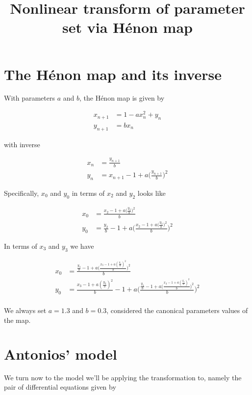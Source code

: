 \documentclass[11pt]{article}
\title{Nonlinear transform of parameter set via H\'{e}non map}
\begin{document}
\maketitle

\section{The H\'{e}non map and its inverse}

With parameters $a$ and $b$, the H\'{e}non map is given by

\begin{align*}
  x_{n+1} &= 1 - ax_n^2 + y_n \\
  y_{n+1} &= bx_n
\end{align*}

with inverse

\begin{align*}
  x_n &= \frac{y_{n+1}}{b} \\
  y_n &= x_{n+1} - 1 + a \bigg( \frac{y_{n+1}}{b} \bigg)^2
\end{align*}

Specifically, $x_0$ and $y_0$ in terms of $x_2$ and $y_2$ looks like

\begin{align*}
  x_0 &= \frac{x_2 - 1 + a \big( \frac{y_2}{b} \big)^2}{b} \\
  y_0 &= \frac{y_2}{b} - 1 + a \bigg( \frac{x_2 - 1 + a \big(
        \frac{y_2}{b} \big)^2}{b} \bigg)^2
\end{align*}

In terms of $x_3$ and $y_3$ we have

\begin{align*}
  x_0 &= \frac{\frac{y_3}{b} - 1 + a \big( \frac{x_3 - 1 + a
        (\frac{y_3}{b})^2}{b} \big)^2}{b} \\
  y_0 &= \frac{x_3 - 1 + a (\frac{y_3}{b})^2}{b} - 1 + a \bigg(
        \frac{\frac{y_3}{b} - 1 + a \big( \frac{x_3 - 1 + a 
        (\frac{y_3}{b})^2}{b} \big)^2}{b} \bigg)^2 \\
\end{align*}

We always set $a = 1.3$ and $b = 0.3$, considered the canonical
parameters values of the map.

\section{Antonios' model}

We turn now to the model we'll be applying the transformation to,
namely the pair of differential equations given by
\end{document}
